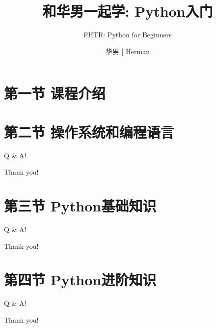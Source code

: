 \documentclass{beamer}
\title{
    和华男一起学: Python入门
    }
\subtitle{
    FHTR: Python for Beginners
    }
\date{}
\author{华男 | Herman}
\institute{\color{gray}{Follow Herman to Learn (FHTR)}}
\begin{document}
\maketitle

\section{第一节 \space 课程介绍}

\section{第二节 \space 操作系统和编程语言} %
\begin{frame}[standout] Q \& A! \end{frame}
\begin{frame}[standout] Thank you! \end{frame}

\section{第三节 \space Python基础知识} %






\begin{frame}[standout] Q \& A! \end{frame}
\begin{frame}[standout] Thank you! \end{frame}

\section{第四节 \space Python进阶知识}







\begin{frame}[standout] Q \& A! \end{frame}
\begin{frame}[standout] Thank you! \end{frame}
\end{document}

